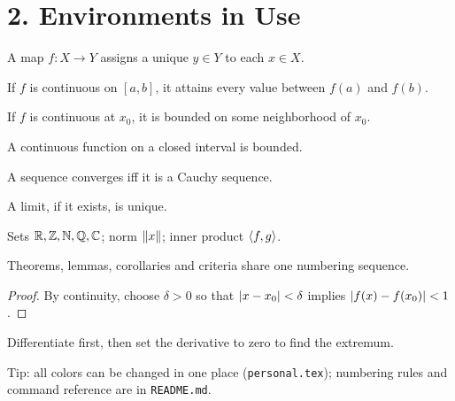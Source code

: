 \documentclass[12pt, a4paper, oneside, UTF8]{ctexbook}
\begin{document}
\section*{2. Environments in Use}

\begin{minipage}[t]{0.485\linewidth}
\begin{definition}[Example]
  A map $f:X\to Y$ assigns a unique $y\in Y$ to each $x\in X$.
\end{definition}
\begin{theorem}
  If $f$ is continuous on $[a,b]$, it attains every value between $f(a)$ and $f(b)$.
\end{theorem}
\begin{lemma}
  If $f$ is continuous at $x_0$, it is bounded on some neighborhood of $x_0$.
\end{lemma}
\begin{corollary}[Boundedness]
  A continuous function on a closed interval is bounded.
\end{corollary}
\end{minipage}\hfill
\begin{minipage}[t]{0.485\linewidth}
\begin{criterion}
  A sequence converges iff it is a Cauchy sequence.
\end{criterion}
\begin{proposition}[Uniqueness]
  A limit, if it exists, is unique.
\end{proposition}
\begin{example}[Shortcuts]
  Sets $\mathbb{R},\mathbb{Z},\mathbb{N},\mathbb{Q},\mathbb{C}$; norm $\left\lVert x \right\rVert$; inner product $\left\langle f,g \right\rangle$.
\end{example}
\begin{remark}[Note]
  Theorems, lemmas, corollaries and criteria share one numbering sequence.
\end{remark}
\end{minipage}

\vspace{2mm}
\begin{proof}
  By continuity, choose $\delta>0$ so that $\left\lvert x-x_0 \right\rvert<\delta$ implies $\left\lvert f(x)-f(x_0) \right\rvert<1$.\qedhere
\end{proof}
\begin{solution}
  Differentiate first, then set the derivative to zero to find the extremum.
\end{solution}

\vspace{2mm}
{\footnotesize\color{black!60}
Tip: all colors can be changed in one place (\texttt{personal.tex}); numbering rules and command reference are in \texttt{README.md}.}
\end{document}
